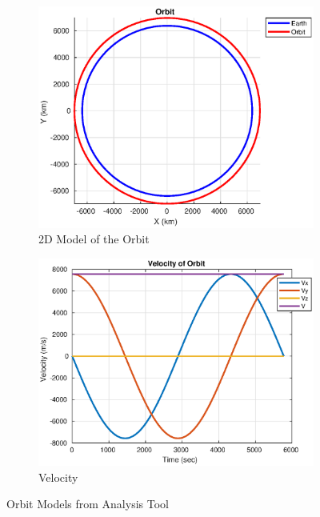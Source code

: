 \documentclass[conf]{new-aiaa}
\begin{document}
\begin{figure}[H]
     \centering
     \begin{subfigure}[b]{0.45\textwidth}
         \centering
         \includegraphics[width=\textwidth]{Figures/Orbit_Circular.eps}
         \caption{2D Model of the Orbit}
         \label{fig:Orbit_Circ}
     \end{subfigure}
     \hfill
     \begin{subfigure}[b]{0.45\textwidth}
         \centering
         \includegraphics[width=\textwidth]{Figures/Velocity.eps}
         \caption{Velocity}
         \label{fig:Orbit_Para}
     \end{subfigure}
        \caption{Orbit Models from Analysis Tool}
        \label{fig:Orbit_Models}
\end{figure}
\end{document}
